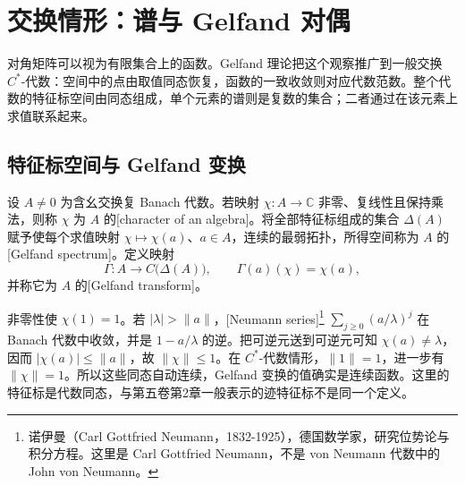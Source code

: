 

\section{交换情形：谱与 Gelfand 对偶}
\label{b2:sec:D02}

对角矩阵可以视为有限集合上的函数。Gelfand 理论把这个观察推广到一般交换 \(C^*\)-代数：空间中的点由取值同态恢复，函数的一致收敛则对应代数范数。整个代数的特征标空间由同态组成，单个元素的谱则是复数的集合；二者通过在该元素上求值联系起来。

\subsection{特征标空间与 Gelfand 变换}
\label{b2:subsec:D02:01}

\begin{definition}\label{b2:def:gelfand-spectrum}
	设 \(A\ne0\) 为含幺交换复 Banach 代数。若映射 \(\chi:A\to\mathbb C\) 非零、复线性且保持乘法，则称 \(\chi\) 为 \(A\) 的[character of an algebra]。将全部特征标组成的集合 \(\Delta(A)\) 赋予使每个求值映射 \(\chi\mapsto\chi(a)\)、\(a\in A\)，连续的最弱拓扑，所得空间称为 \(A\) 的[Gelfand spectrum]。定义映射
	\[
		\Gamma:A\longrightarrow C\bigl(\Delta(A)\bigr),\qquad \Gamma(a)(\chi)=\chi(a),
	\]
	并称它为 \(A\) 的[Gelfand transform]。
\end{definition}

非零性使 \(\chi(1)=1\)。若 \(|\lambda|>\|a\|\)，[Neumann series]\footnote{诺伊曼（Carl Gottfried Neumann，1832-1925），德国数学家，研究位势论与积分方程。这里是 Carl Gottfried Neumann，不是 von Neumann 代数中的 John von Neumann。} \(\sum_{j\ge0}(a/\lambda)^j\) 在 Banach 代数中收敛，并是 \(1-a/\lambda\) 的逆。把可逆元送到可逆元可知 \(\chi(a)\ne\lambda\)，因而 \(\bigl|\chi(a)\bigr|\le\|a\|\)，故 \(\|\chi\|\le1\)。在 \(C^*\)-代数情形，\(\|1\|=1\)，进一步有 \(\|\chi\|=1\)。所以这些同态自动连续，Gelfand 变换的值确实是连续函数。这里的特征标是代数同态，与第五卷第2章一般表示的迹特征标不是同一个定义。

